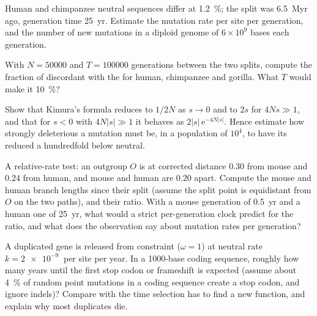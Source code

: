 \begin{exercise}[$\star\star$]\label{exo:b3:molecular-evolution:8}
Human and chimpanzee neutral sequences differ at \qty{1.2}{\%}; the
split was \qty{6.5}{Myr} ago, generation time \qty{25}{yr}. Estimate the
mutation rate per site per generation, and the number of new mutations
in a diploid genome of $6\times 10^{9}$ bases each generation.
\end{exercise}

\begin{exercise}[$\star\star$]\label{exo:b3:molecular-evolution:9}
With $N = \num{50000}$ and $T = \num{100000}$ generations between the
two splits, compute the fraction of  discordant with the
 for human, chimpanzee and gorilla. What $T$ would make it
\qty{10}{\%}?
\end{exercise}

\begin{exercise}[$\star\star\star$]\label{exo:b3:molecular-evolution:10}
Show that Kimura's formula reduces to $1/2N$ as $s \to 0$ and to $2s$
for $4Ns \gg 1$, and that for $s < 0$ with $4N|s| \gg 1$ it behaves as
$2|s|\,\mathrm{e}^{-4N|s|}$. Hence estimate how strongly deleterious a
mutation must be, in a population of $10^{4}$, to have its  reduced a hundredfold below neutral.
\end{exercise}

\begin{exercise}[$\star\star\star$]\label{exo:b3:molecular-evolution:11}
A relative-rate test: an outgroup $O$ is at corrected distance $0.30$
from mouse and $0.24$ from human, and mouse and human are $0.20$ apart. Compute the mouse and human branch
lengths since their split (assume the split point is equidistant from
$O$ on the two paths), and their ratio. With a mouse generation of
\qty{0.5}{yr} and a human one of \qty{25}{yr}, what would a strict
per-generation clock predict for the ratio, and what does the
observation say about mutation rates per generation?
\end{exercise}

\begin{exercise}[$\star\star\star$]\label{exo:b3:molecular-evolution:12}
A duplicated gene is released from constraint ($\omega = 1$) at
neutral rate $k = \qty{2e-9}{}$ per site per year. In a 1000-base
coding sequence, roughly how many years until the first stop codon or
frameshift is expected (assume about \qty{4}{\%} of random point
mutations in a coding sequence create a stop codon, and ignore indels)?
Compare with the time selection has to find a new function, and explain
why most duplicates die.
\end{exercise}

